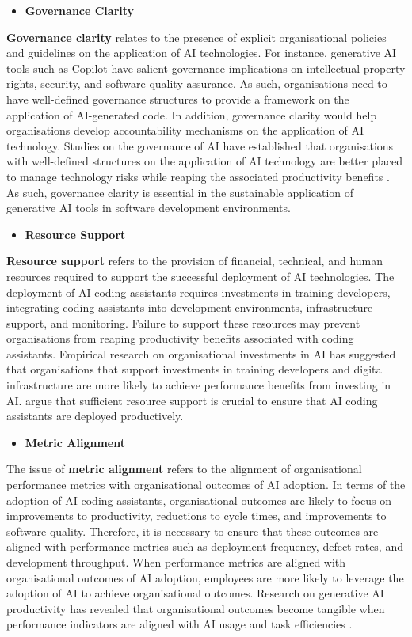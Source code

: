 \begin{itemize}
	\item \textbf{Governance Clarity} 
\end{itemize}
\textbf{Governance clarity} relates to the presence of explicit organisational policies and guidelines on the application of AI technologies. For instance, generative AI tools such as Copilot have salient governance implications on intellectual property rights, security, and software quality assurance. As such, organisations need to have well-defined governance structures to provide a framework on the application of AI-generated code. In addition, governance clarity would help organisations develop accountability mechanisms on the application of AI technology. Studies on the governance of AI have established that organisations with well-defined structures on the application of AI technology are better placed to manage technology risks while reaping the associated productivity benefits \autocite{Hradecky2022}. As such, governance clarity is essential in the sustainable application of generative AI tools in software development environments.

\begin{itemize}
	\item \textbf{Resource Support} 
\end{itemize}
\textbf{Resource support} refers to the provision of financial, technical, and human resources required to support the successful deployment of AI technologies. The deployment of AI coding assistants requires investments in training developers, integrating coding assistants into development environments, infrastructure support, and monitoring. Failure to support these resources may prevent organisations from reaping productivity benefits associated with coding assistants. Empirical research on organisational investments in AI has suggested that organisations that support investments in training developers and digital infrastructure are more likely to achieve performance benefits from investing in AI. \textcite{Babina2024} argue that sufficient resource support is crucial to ensure that AI coding assistants are deployed productively.

\begin{itemize}
	\item \textbf{Metric Alignment} 
\end{itemize}
The issue of \textbf{metric alignment} refers to the alignment of organisational performance metrics with organisational outcomes of AI adoption. In terms of the adoption of AI coding assistants, organisational outcomes are likely to focus on improvements to productivity, reductions to cycle times, and improvements to software quality. Therefore, it is necessary to ensure that these outcomes are aligned with performance metrics such as deployment frequency, defect rates, and development throughput. When performance metrics are aligned with organisational outcomes of AI adoption, employees are more likely to leverage the adoption of AI to achieve organisational outcomes. Research on generative AI productivity has revealed that organisational outcomes become tangible when performance indicators are aligned with AI usage and task efficiencies \autocite{Noy2023}.

